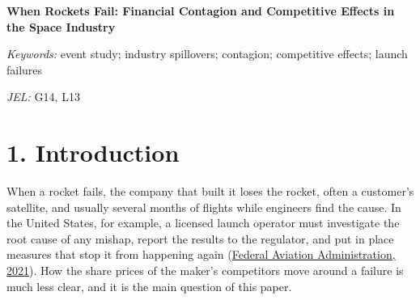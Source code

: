 \documentclass[12pt,a4paper]{article}
\begin{document}
{\raggedright{\LARGE\bfseries When Rockets Fail: Financial Contagion and Competitive Effects in the Space Industry\par}\vspace{6pt}{\large Evidence from publicly listed launch providers: stock market reactions to orbital launch failures, 2000 to 2026.\par}}
\vspace{6pt}
\begin{abstract}
\noindent This paper asks how equity markets react when an orbital launch fails, both for the company that built the rocket and for its publicly listed competitors. Using 138 orbital launch failures from 2000 to 2026 (GCAT) and a market-model event study with a prespecified test, it finds that in the 4 failures with a listed maker (2 firms) the maker's two-day cumulative abnormal return was between \textminus{}8.8\% and \textminus{}16.3\%, each case with a 95\% interval excluding zero. Across 24 failures with listed competitors (42 stock reactions, 3 firms, 22 independent events), the equal-weighted average two-day cumulative abnormal return is +0.28\% (95\% cluster-robust interval \textminus{}1.62\% to +2.18\%; cluster-robust p = 0.76); the prespecified standardized test (Boehmer-Musumeci-Poulsen with a Kolari-Pynnönen adjustment) gives p = 0.40. The evidence therefore establishes neither systematic contagion nor systematic competitive gains among these firms, and it does not show the effect is negligible: average effects of about 2.7\% in either direction would usually go undetected. The sign of the estimate changes with how events and firms are weighted, and every independent event involves Avio SpA. The study is a small-sample study of listed firms, not an estimate for the launch industry as a whole.
\end{abstract}

\emph{Keywords:} event study; industry spillovers; contagion; competitive effects; launch failures

\emph{JEL:} G14, L13

\section*{\hypertarget{s1}{}1. Introduction}
When a rocket fails, the company that built it loses the rocket, often a customer's satellite, and usually several months of flights while engineers find the cause. In the United States, for example, a licensed launch operator must investigate the root cause of any mishap, report the results to the regulator, and put in place measures that stop it from happening again (\hyperlink{ref-faa2021}{Federal Aviation Administration, 2021}). How the share prices of the maker's competitors move around a failure is much less clear, and it is the main question of this paper.
\end{document}
